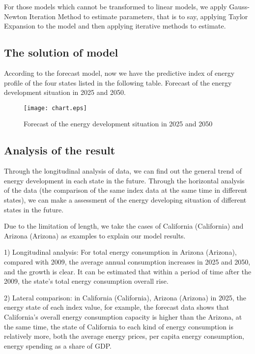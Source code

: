 For those models which cannot be transformed to linear models, we apply Gauss-Newton Iteration Method to estimate parameters, that is to say, applying Taylor Expansion to the model and then applying iterative methods to estimate.   

\subsection{The solution of model}
According to the forecast model, now we have the predictive index of energy profile of the four states listed in the following table.
Forecast of the energy development situation in 2025 and 2050.
\begin{figure}[h]

\centering
\texttt{[image: chart.eps]}
\caption{Forecast of the energy development situation in 2025 and 2050} 
\end{figure}



\newpage
\subsection{Analysis of the result}


Through the longitudinal analysis of data, we can find out the general trend of energy development in each state in the future. Through the horizontal analysis of the data (the comparison of the same index data at the same time in different states), we can make a assessment of the energy developing situation of different states in the future.



Due to the limitation of length, we take the cases of California (California) and Arizona (Arizona) as examples to explain our model results.


1) Longitudinal analysis: For total energy consumption in Arizona (Arizona), compared with 2009, the average annual consumption increases in 2025 and 2050, and the growth is clear. It can be estimated that within a period of time after the 2009, the state's total energy consumption overall rise.


2) Lateral comparison: in California (California), Arizona (Arizona) in 2025, the energy state of each index value, for example, the forecast data shows that California's overall energy consumption capacity is higher than the Arizona, at the same time, the state of California to each kind of energy consumption is relatively more, both the average energy prices, per capita energy consumption, energy spending as a share of GDP.


